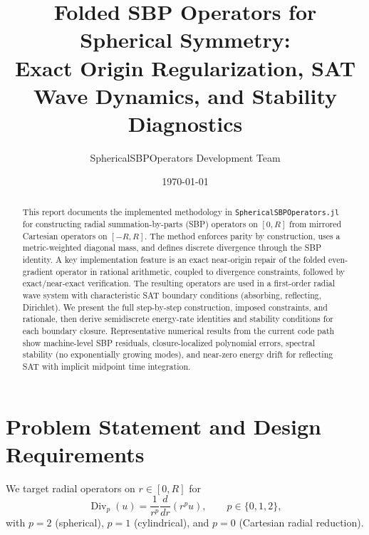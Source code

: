 \documentclass[
  aps,
  pre,
  reprint,
  superscriptaddress,
  nofootinbib
]{revtex4-2}
\newcommand{\Divp}{\operatorname{Div}_{p}}
\begin{document}
\title{Folded SBP Operators for Spherical Symmetry:\\
Exact Origin Regularization, SAT Wave Dynamics, and Stability Diagnostics}

\author{SphericalSBPOperators Development Team}

\date{\today}

\begin{abstract}
This report documents the implemented methodology in
\texttt{SphericalSBPOperators.jl} for constructing radial summation-by-parts (SBP)
operators on $[0,R]$ from mirrored Cartesian operators on $[-R,R]$. The method
enforces parity by construction, uses a metric-weighted diagonal mass, and defines
discrete divergence through the SBP identity. A key implementation feature is an exact
near-origin repair of the folded even-gradient operator in rational arithmetic, coupled
to divergence constraints, followed by exact/near-exact verification. The resulting
operators are used in a first-order radial wave system with characteristic SAT boundary
conditions (absorbing, reflecting, Dirichlet). We present the full step-by-step
construction, imposed constraints, and rationale, then derive semidiscrete energy-rate
identities and stability conditions for each boundary closure. Representative numerical
results from the current code path show machine-level SBP residuals, closure-localized
polynomial errors, spectral stability (no exponentially growing modes), and near-zero
energy drift for reflecting SAT with implicit midpoint time integration.
\end{abstract}

\maketitle

\section{Problem Statement and Design Requirements}
We target radial operators on $r\in[0,R]$ for
\begin{equation}
\Divp(u) = \frac{1}{r^p}\frac{d}{dr}\left(r^p u\right), \qquad p\in\{0,1,2\},
\end{equation}
with $p=2$ (spherical), $p=1$ (cylindrical), and $p=0$ (Cartesian radial reduction).
\end{document}
